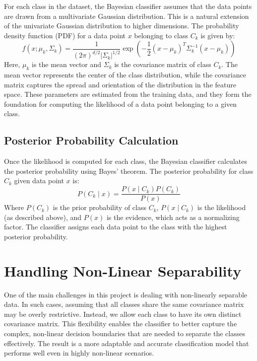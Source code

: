 \documentclass[conference]{IEEEtran}
\begin{document}
For each class in the dataset, the Bayesian classifier assumes that the data points are drawn from a multivariate Gaussian distribution. This is a natural extension of the univariate Gaussian distribution to higher dimensions. The probability density function (PDF) for a data point \( x \) belonging to class \( C_k \) is given by:
\[
f(x; \mu_k, \Sigma_k) = \frac{1}{(2\pi)^{d/2} |\Sigma_k|^{1/2}} \exp\left(-\frac{1}{2} (x - \mu_k)^T \Sigma_k^{-1} (x - \mu_k)\right)
\]
Here, \( \mu_k \) is the mean vector and \( \Sigma_k \) is the covariance matrix of class \( C_k \). The mean vector represents the center of the class distribution, while the covariance matrix captures the spread and orientation of the distribution in the feature space. These parameters are estimated from the training data, and they form the foundation for computing the likelihood of a data point belonging to a given class.

\subsection{Posterior Probability Calculation}

Once the likelihood is computed for each class, the Bayesian classifier calculates the posterior probability using Bayes' theorem. The posterior probability for class \( C_k \) given data point \( x \) is:
\[
P(C_k \mid x) = \frac{P(x \mid C_k) P(C_k)}{P(x)}
\]
Where \( P(C_k) \) is the prior probability of class \( C_k \), \( P(x \mid C_k) \) is the likelihood (as described above), and \( P(x) \) is the evidence, which acts as a normalizing factor. The classifier assigns each data point to the class with the highest posterior probability.

\section{Handling Non-Linear Separability}

One of the main challenges in this project is dealing with non-linearly separable data. In such cases, assuming that all classes share the same covariance matrix may be overly restrictive. Instead, we allow each class to have its own distinct covariance matrix. This flexibility enables the classifier to better capture the complex, non-linear decision boundaries that are needed to separate the classes effectively. The result is a more adaptable and accurate classification model that performs well even in highly non-linear scenarios.
\end{document}
